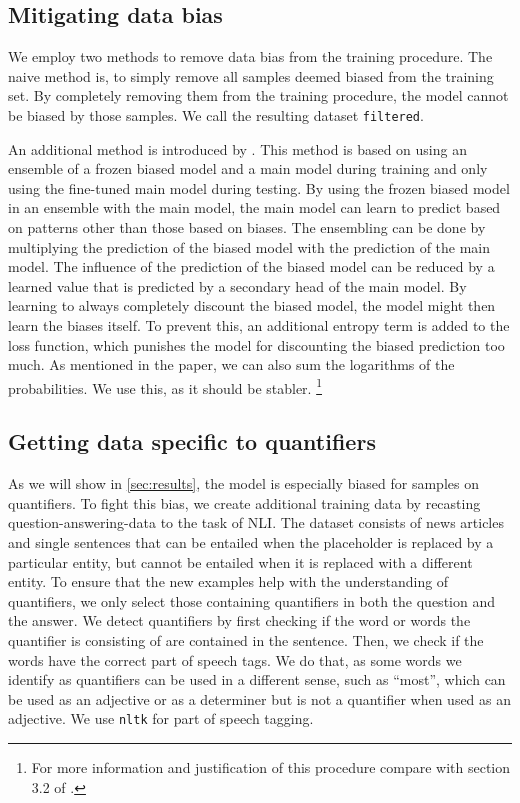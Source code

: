 \subsection{Mitigating data bias}\label{par:method:mitigating_data_bias}

We employ two methods to remove data bias from the training procedure. The naive method is, to simply remove all samples deemed biased from the training set. By completely removing them from the training procedure, the model cannot be biased by those samples. We call the resulting dataset \texttt{filtered}.

An additional method is introduced by \citet{ensemble}. This method is based on using an ensemble of a frozen biased model and a main model during training and only using the fine-tuned main model during testing. By using the frozen biased model in an ensemble with the main model, the main model can learn to predict based on patterns other than those based on biases. The ensembling can be done by multiplying the prediction of the biased model with the prediction of the main model. The influence of the prediction of the biased model can be reduced by a learned value that is predicted by a secondary head of the main model. By learning to always completely discount the biased model, the model might then learn the biases itself. To prevent this, an additional entropy term is added to the loss function, which punishes the model for discounting the biased prediction too much. As mentioned in the paper, we can also sum the logarithms of the probabilities. We use this, as it should be stabler. \footnote{For more information and justification of this procedure compare with section 3.2 of \cite{ensemble}.}

\subsection{Getting data specific to quantifiers} \label{sec:meth:recasting}

As we will show in \autoref{sec:results}, the model is especially biased for samples on quantifiers. To fight this bias, we create additional training data by recasting question-answering-data to the task of \ac{NLI}. The dataset consists of news articles and single sentences that can be entailed when the placeholder is replaced by a particular entity, but cannot be entailed when it is replaced with a different entity. To ensure that the new examples help with the understanding of quantifiers, we only select those containing quantifiers in both the question and the answer. We detect quantifiers by first checking if the word or words the quantifier is consisting of are contained in the sentence. Then, we check if the words have the correct part of speech tags. We do that, as some words we identify as quantifiers can be used in a different sense, such as \enquote{most}, which can be used as an adjective or as a determiner but is not a quantifier when used as an adjective. We use \texttt{nltk} \cite{nltk} for part of speech tagging.

